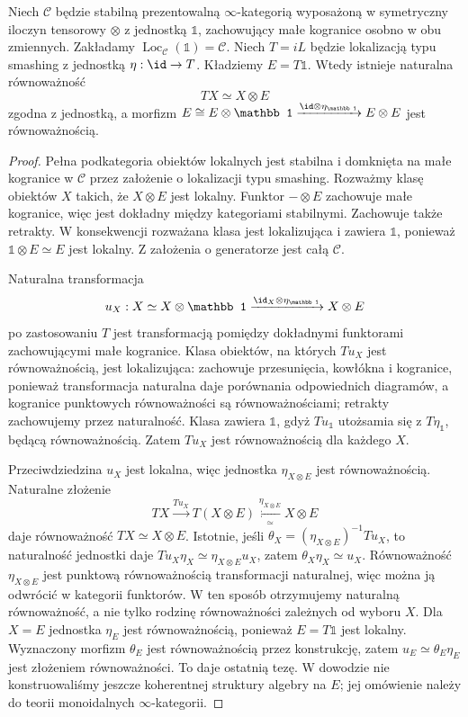\begin{twierdzenie}\label{cat:thm:infty-bousfield-smashing-tensor}
Niech $\mathcal C$ będzie stabilną prezentowalną $\infty$-kategorią wyposażoną w symetryczny iloczyn tensorowy $\otimes$ z jednostką $\mathbb 1$, zachowujący małe kogranice osobno w obu zmiennych. Zakładamy $\operatorname{Loc}_{\mathcal C}(\mathbb 1)=\mathcal C$. Niech $T=iL$ będzie lokalizacją typu smashing z jednostką $\eta:\id\to T$. Kładziemy $E=T\mathbb 1$. Wtedy istnieje naturalna równoważność
\[
 TX\simeq X\otimes E
\]
zgodna z jednostką, a morfizm $E\cong E\otimes\mathbb 1\xrightarrow{\id\otimes\eta_{\mathbb 1}} E\otimes E$ jest równoważnością.
\end{twierdzenie}
\begin{proof}
Pełna podkategoria obiektów lokalnych jest stabilna i domknięta na małe kogranice w $\mathcal C$ przez założenie o lokalizacji typu smashing. Rozważmy klasę obiektów $X$ takich, że $X\otimes E$ jest lokalny. Funktor $-\otimes E$ zachowuje małe kogranice, więc jest dokładny między kategoriami stabilnymi. Zachowuje także retrakty. W konsekwencji rozważana klasa jest lokalizująca i zawiera $\mathbb 1$, ponieważ $\mathbb 1\otimes E\simeq E$ jest lokalny. Z założenia o generatorze jest całą $\mathcal C$.

Naturalna transformacja
\[
 u_X:X\simeq X\otimes\mathbb 1
 \xrightarrow{\id_X\otimes\eta_{\mathbb 1}}X\otimes E
\]
po zastosowaniu $T$ jest transformacją pomiędzy dokładnymi funktorami zachowującymi małe kogranice. Klasa obiektów, na których $Tu_X$ jest równoważnością, jest lokalizująca: zachowuje przesunięcia, kowłókna i kogranice, ponieważ transformacja naturalna daje porównania odpowiednich diagramów, a kogranice punktowych równoważności są równoważnościami; retrakty zachowujemy przez naturalność. Klasa zawiera $\mathbb 1$, gdyż $Tu_{\mathbb 1}$ utożsamia się z $T\eta_{\mathbb 1}$, będącą równoważnością. Zatem $Tu_X$ jest równoważnością dla każdego $X$.

Przeciwdziedzina $u_X$ jest lokalna, więc jednostka $\eta_{X\otimes E}$ jest równoważnością. Naturalne złożenie
\[
 TX\xrightarrow{Tu_X}T(X\otimes E)
 \xleftarrow[\simeq]{\eta_{X\otimes E}}X\otimes E
\]
daje równoważność $TX\simeq X\otimes E$. Istotnie, jeśli $\theta_X=(\eta_{X\otimes E})^{-1}Tu_X$, to naturalność jednostki daje $Tu_X\eta_X\simeq\eta_{X\otimes E}u_X$, zatem $\theta_X\eta_X\simeq u_X$. Równoważność $\eta_{X\otimes E}$ jest punktową równoważnością transformacji naturalnej, więc można ją odwrócić w kategorii funktorów. W ten sposób otrzymujemy naturalną równoważność, a nie tylko rodzinę równoważności zależnych od wyboru $X$. Dla $X=E$ jednostka $\eta_E$ jest równoważnością, ponieważ $E=T\mathbb 1$ jest lokalny. Wyznaczony morfizm $\theta_E$ jest równoważnością przez konstrukcję, zatem $u_E\simeq\theta_E\eta_E$ jest złożeniem równoważności. To daje ostatnią tezę. W dowodzie nie konstruowaliśmy jeszcze koherentnej struktury algebry na $E$; jej omówienie należy do teorii monoidalnych $\infty$-kategorii.
\end{proof}

